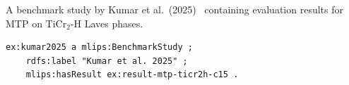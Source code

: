 A benchmark study by Kumar et al.\ (2025)~\cite{kumar2025ticr2h} containing
evaluation results for MTP on TiCr$_2$-H Laves phases.
\begin{lstlisting}[language=turtle]
ex:kumar2025 a mlips:BenchmarkStudy ;
    rdfs:label "Kumar et al. 2025" ;
    mlips:hasResult ex:result-mtp-ticr2h-c15 .
\end{lstlisting}
